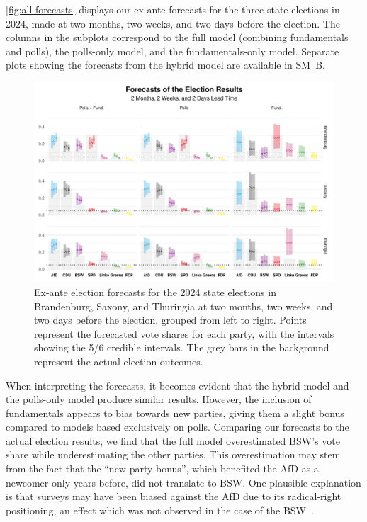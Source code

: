 \documentclass[doublespaced,12pt]{article}
\begin{document}
\begin{doublespacing}
\autoref{fig:all-forecasts} displays our ex-ante forecasts for the three state elections in 2024, made at two months, two weeks, and two days before the election. The columns in the subplots correspond to the full model (combining fundamentals and polls), the polls-only model, and the fundamentals-only model. Separate plots showing the forecasts from the hybrid model are available in SM~B. 

\begin{figure}[!t]
    \centering
    \includegraphics[width=\textwidth]{fg5_all_fcsts.pdf}
    \caption{Ex-ante election forecasts for the 2024 state elections in Brandenburg, Saxony, and Thuringia at two months, two weeks, and two days before the election, grouped from left to right. Points represent the forecasted vote shares for each party, with the intervals showing the 5/6 credible intervals. The grey bars in the background represent the actual election outcomes.}
    \label{fig:all-forecasts}
\end{figure}

When interpreting the forecasts, it becomes evident that the hybrid model and the polls-only model produce similar results. However, the inclusion of fundamentals appears to bias towards new parties, giving them a slight bonus compared to models based exclusively on polls. Comparing our forecasts to the actual election results, we find that the full model overestimated BSW's vote share while underestimating the other parties. This overestimation may stem from the fact that the “new party bonus”, which benefited the AfD as a newcomer only years before, did not translate to BSW. One plausible explanation is that surveys may have been biased against the AfD due to its radical-right positioning, an effect which was not observed in the case of the  BSW~\citep{valentim_right_2021}.


\end{doublespacing}
\end{document}
